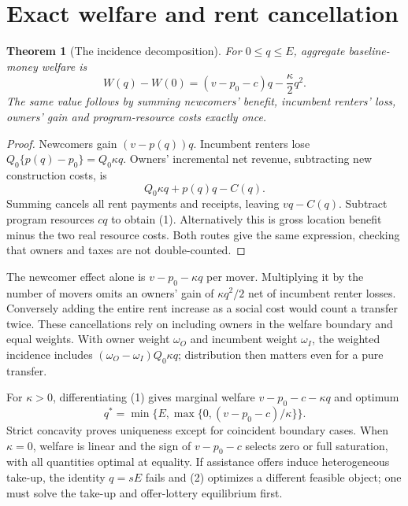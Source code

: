 \documentclass[11pt,a4paper]{article}
\newtheorem{theorem}{Theorem}[section]
\begin{document}
\section{Exact welfare and rent cancellation}
\begin{theorem}[The incidence decomposition]
For $0\le q\le E$, aggregate baseline-money welfare is
\[
 W(q)-W(0)=(v-p_0-c)q-\frac\kappa2q^2.                    \tag{1}
\]
The same value follows by summing newcomers' benefit, incumbent renters' loss, owners' gain and program-resource costs exactly once.
\end{theorem}
\begin{proof}
Newcomers gain $(v-p(q))q$. Incumbent renters lose $Q_0\{p(q)-p_0\}=Q_0\kappa q$. Owners' incremental net revenue, subtracting new construction costs, is
\[
 Q_0\kappa q+p(q)q-C(q).
\]
Summing cancels all rent payments and receipts, leaving $vq-C(q)$. Subtract program resources $cq$ to obtain (1). Alternatively this is gross location benefit minus the two real resource costs. Both routes give the same expression, checking that owners and taxes are not double-counted.
\end{proof}

The newcomer effect alone is $v-p_0-\kappa q$ per mover. Multiplying it by the number of movers omits an owners' gain of $\kappa q^2/2$ net of incumbent renter losses. Conversely adding the entire rent increase as a social cost would count a transfer twice. These cancellations rely on including owners in the welfare boundary and equal weights. With owner weight $\omega_O$ and incumbent weight $\omega_I$, the weighted incidence includes
$(\omega_O-\omega_I)Q_0\kappa q$; distribution then matters even for a pure transfer.

For $\kappa>0$, differentiating (1) gives marginal welfare $v-p_0-c-\kappa q$ and optimum
\[
 q^*=\min\{E,\max\{0,(v-p_0-c)/\kappa\}\}.                \tag{2}
\]
Strict concavity proves uniqueness except for coincident boundary cases. When $\kappa=0$, welfare is linear and the sign of $v-p_0-c$ selects zero or full saturation, with all quantities optimal at equality. If assistance offers induce heterogeneous take-up, the identity $q=sE$ fails and (2) optimizes a different feasible object; one must solve the take-up and offer-lottery equilibrium first.
\end{document}
